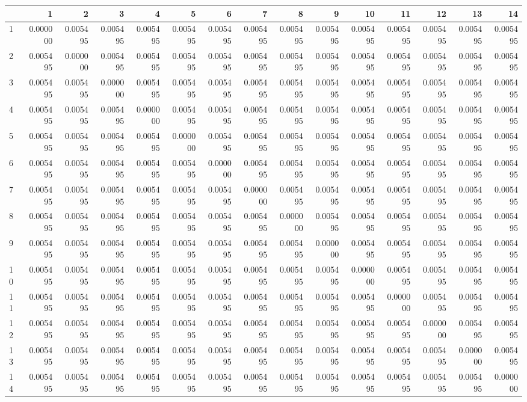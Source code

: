 \begin{tabular}{lrrrrrrrrrrrrrr}
\toprule
{} &        1  &        2  &        3  &        4  &        5  &        6  &        7  &        8  &        9  &        10 &        11 &        12 &        13 &        14 \\
\midrule
1  &  0.000000 &  0.005495 &  0.005495 &  0.005495 &  0.005495 &  0.005495 &  0.005495 &  0.005495 &  0.005495 &  0.005495 &  0.005495 &  0.005495 &  0.005495 &  0.005495 \\
2  &  0.005495 &  0.000000 &  0.005495 &  0.005495 &  0.005495 &  0.005495 &  0.005495 &  0.005495 &  0.005495 &  0.005495 &  0.005495 &  0.005495 &  0.005495 &  0.005495 \\
3  &  0.005495 &  0.005495 &  0.000000 &  0.005495 &  0.005495 &  0.005495 &  0.005495 &  0.005495 &  0.005495 &  0.005495 &  0.005495 &  0.005495 &  0.005495 &  0.005495 \\
4  &  0.005495 &  0.005495 &  0.005495 &  0.000000 &  0.005495 &  0.005495 &  0.005495 &  0.005495 &  0.005495 &  0.005495 &  0.005495 &  0.005495 &  0.005495 &  0.005495 \\
5  &  0.005495 &  0.005495 &  0.005495 &  0.005495 &  0.000000 &  0.005495 &  0.005495 &  0.005495 &  0.005495 &  0.005495 &  0.005495 &  0.005495 &  0.005495 &  0.005495 \\
6  &  0.005495 &  0.005495 &  0.005495 &  0.005495 &  0.005495 &  0.000000 &  0.005495 &  0.005495 &  0.005495 &  0.005495 &  0.005495 &  0.005495 &  0.005495 &  0.005495 \\
7  &  0.005495 &  0.005495 &  0.005495 &  0.005495 &  0.005495 &  0.005495 &  0.000000 &  0.005495 &  0.005495 &  0.005495 &  0.005495 &  0.005495 &  0.005495 &  0.005495 \\
8  &  0.005495 &  0.005495 &  0.005495 &  0.005495 &  0.005495 &  0.005495 &  0.005495 &  0.000000 &  0.005495 &  0.005495 &  0.005495 &  0.005495 &  0.005495 &  0.005495 \\
9  &  0.005495 &  0.005495 &  0.005495 &  0.005495 &  0.005495 &  0.005495 &  0.005495 &  0.005495 &  0.000000 &  0.005495 &  0.005495 &  0.005495 &  0.005495 &  0.005495 \\
10 &  0.005495 &  0.005495 &  0.005495 &  0.005495 &  0.005495 &  0.005495 &  0.005495 &  0.005495 &  0.005495 &  0.000000 &  0.005495 &  0.005495 &  0.005495 &  0.005495 \\
11 &  0.005495 &  0.005495 &  0.005495 &  0.005495 &  0.005495 &  0.005495 &  0.005495 &  0.005495 &  0.005495 &  0.005495 &  0.000000 &  0.005495 &  0.005495 &  0.005495 \\
12 &  0.005495 &  0.005495 &  0.005495 &  0.005495 &  0.005495 &  0.005495 &  0.005495 &  0.005495 &  0.005495 &  0.005495 &  0.005495 &  0.000000 &  0.005495 &  0.005495 \\
13 &  0.005495 &  0.005495 &  0.005495 &  0.005495 &  0.005495 &  0.005495 &  0.005495 &  0.005495 &  0.005495 &  0.005495 &  0.005495 &  0.005495 &  0.000000 &  0.005495 \\
14 &  0.005495 &  0.005495 &  0.005495 &  0.005495 &  0.005495 &  0.005495 &  0.005495 &  0.005495 &  0.005495 &  0.005495 &  0.005495 &  0.005495 &  0.005495 &  0.000000 \\
\bottomrule
\end{tabular}
